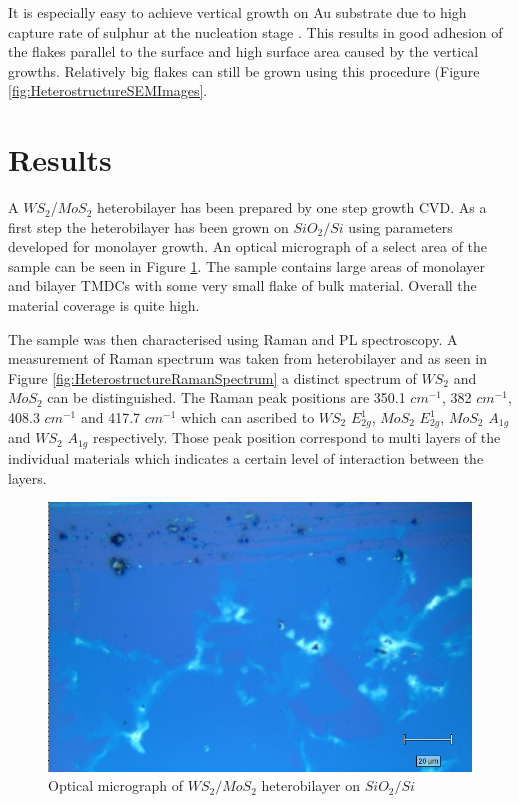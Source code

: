 It is especially easy to achieve vertical growth on Au substrate due to high capture rate of sulphur at the nucleation stage \cite{Gao2015}. This results in good adhesion of the flakes parallel to the surface and high surface area caused by the vertical growths. Relatively big flakes can still be grown using this procedure (Figure \ref{fig:HeterostructureSEMImages}.

\section{Results}

A $WS_2$/$MoS_2$ heterobilayer has been prepared by one step growth CVD. As a first step the heterobilayer has been grown on $SiO_2/Si$ using parameters developed for monolayer growth. An optical micrograph of a select area of the sample can be seen in Figure \ref{fig:HeterostructureOMSi}. The sample contains large areas of monolayer and bilayer TMDCs with some very small flake of bulk material. Overall the material coverage is quite high.

The sample was then characterised using Raman and PL spectroscopy. A measurement of Raman spectrum was taken from heterobilayer and as seen in Figure \ref{fig:HeterostructureRamanSpectrum} a distinct spectrum of $WS_2$ and $MoS_2$ can be distinguished. The Raman peak positions are 350.1 $cm^{-1}$, 382 $cm^{-1}$, 408.3 $cm^{-1}$ and 417.7 $cm^{-1}$ which can ascribed to $WS_2$ $E^1_{2g}$, $MoS_2$ $E^1_{2g}$, $MoS_2$ $A_{1g}$ and $WS_2$ $A_{1g}$ respectively. Those peak position correspond to multi layers of the individual materials which indicates a certain level of interaction between the layers.

\begin{figure}[H]
	\begin{center}
		\includegraphics[scale=0.5]{Heterostructures/OmSi.png}
		\caption{Optical micrograph of $WS_2/MoS_2$ heterobilayer on $SiO_2/Si$}
		\label{fig:HeterostructureOMSi}
	\end{center}
\end{figure}

